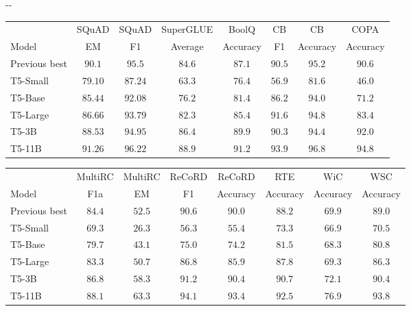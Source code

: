 \documentclass[twoside,11pt]{article}
\newlength{\offsetpage}
\newenvironment{widepage}{\begin{adjustwidth}{-\offsetpage}{-\offsetpage}
    \addtolength{\textwidth}{2\offsetpage}}
{\end{adjustwidth}}
\newcommand{\xa}{\makebox[0pt][l]{$^a$}}
\newcommand{\xd}{\makebox[0pt][l]{$^d$}}
\def\*#1{\mathbf{#1}}
\begin{document}
\begin{table}
\begin{widepage}
\vspace{0.2em}

\begin{tabular}{l c c c c c c c}
                  & SQuAD       & SQuAD       & SuperGLUE & BoolQ       & CB          & CB        & COPA     \\
    Model         & EM          & F1          & Average   & Accuracy    & F1          & Accuracy  & Accuracy \\
\cmidrule(r){1-1}
\cmidrule(lr){2-3}
\cmidrule(l){4-8}
    Previous best & $90.1$\xa   & $95.5$\xa   & $84.6$\xd  & $87.1$\xd  & $90.5$\xd  & $95.2$\xd  & $90.6$\xd \\
    T5-Small      & $79.10$     & $87.24$     & $63.3$     & $76.4$     & $56.9$     & $81.6$     & $46.0$     \\
    T5-Base       & $85.44$     & $92.08$     & $76.2$     & $81.4$     & $86.2$     & $94.0$     & $71.2$     \\
    T5-Large      & $86.66$     & $93.79$     & $82.3$     & $85.4$     & $91.6$     & $94.8$     & $83.4$     \\
    T5-3B         & $88.53$     & $94.95$     & $86.4$     & $89.9$     & $90.3$     & $94.4$     & $92.0$     \\
    T5-11B        & $\*{91.26}$ & $\*{96.22}$ & $\*{88.9}$ & $\*{91.2}$ & $\*{93.9}$ & $\*{96.8}$ & $\*{94.8}$ \\
\bottomrule
\end{tabular}

\vspace{0.2em}

\begin{tabular}{l c c c c c c c}
                  & MultiRC     & MultiRC   & ReCoRD     & ReCoRD      & RTE       & WiC        & WSC \\
    Model         & F1a         & EM        & F1         & Accuracy    & Accuracy  & Accuracy   & Accuracy\\
\cmidrule(r){1-1}
\cmidrule(l){2-8}
    Previous best & $84.4$\xd  & $52.5$\xd  & $90.6$\xd  & $90.0$\xd  & $88.2$\xd  & $69.9$\xd  & $89.0$\xd \\
    T5-Small      & $69.3$     & $26.3$     & $56.3$     & $55.4$     & $73.3$     & $66.9$     & $70.5$     \\
    T5-Base       & $79.7$     & $43.1$     & $75.0$     & $74.2$     & $81.5$     & $68.3$     & $80.8$     \\
    T5-Large      & $83.3$     & $50.7$     & $86.8$     & $85.9$     & $87.8$     & $69.3$     & $86.3$     \\
    T5-3B         & $86.8$     & $58.3$     & $91.2$     & $90.4$     & $90.7$     & $72.1$     & $90.4$     \\
    T5-11B        & $\*{88.1}$ & $\*{63.3}$ & $\*{94.1}$ & $\*{93.4}$ & $\*{92.5}$ & $\*{76.9}$ & $\*{93.8}$ \\
\bottomrule
\end{tabular}


\end{widepage}
\end{table}
\end{document}
